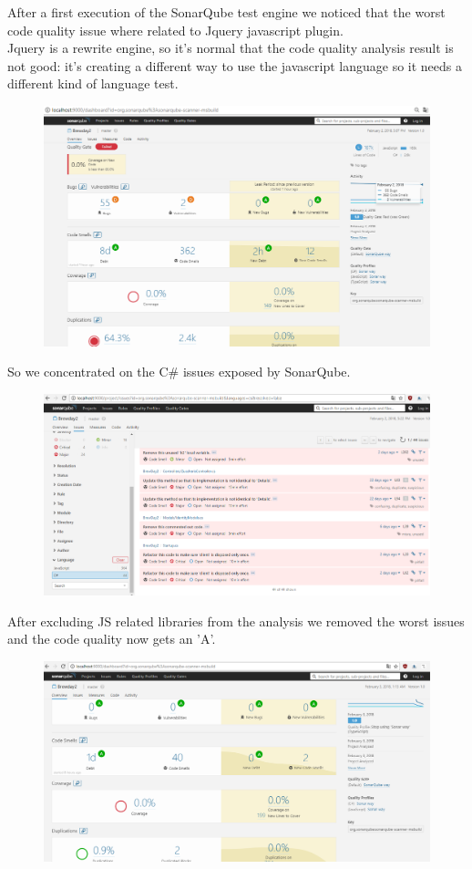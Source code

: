 \documentclass[12pt]{article}
\begin{document}
After a first execution of the SonarQube test engine we noticed that the worst code quality issue where related to Jquery javascript plugin.\\
Jquery is a rewrite engine, so it's normal that the code quality analysis result is not good: it's creating a different way
to use the javascript language so it needs a different kind of language test.
\begin{figure}[H]
\includegraphics[scale=0.5]{sonar1.png}
\end{figure}
\pagebreak
So we concentrated on the C\# issues exposed by SonarQube.
\begin{figure}[H]
\includegraphics[scale=0.5]{sonar2.png}
\end{figure}
\pagebreak
After excluding JS related libraries from the analysis we removed the worst issues and the code quality now gets an 'A'.
\begin{figure}[H]
\includegraphics[scale=0.5]{sonar3.png}
\end{figure}
\end{document}
